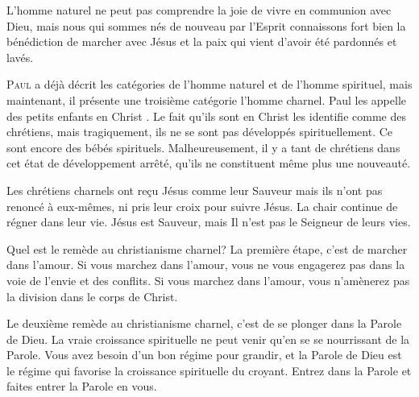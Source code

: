 L'homme naturel ne peut pas comprendre la joie de vivre en communion avec Dieu,
 mais nous qui sommes nés de nouveau par l'Esprit connaissons
 fort bien la bénédiction de marcher avec Jésus
 \ocadr et la paix qui vient d'avoir été pardonnés et lavés.

\dvrule







\lettrine{P}{aul} a déjà décrit les catégories de l'homme naturel
 et de l'homme spirituel, mais maintenant, il présente
 une troisième catégorie \ocadr l'homme charnel.
 Paul les appelle des \Og petits enfants en Christ \Fg{}.
 Le fait qu'ils sont \Og en Christ \Fg{} les identifie
 comme des chrétiens, mais tragiquement, ils ne se sont pas développés
 spirituellement. Ce sont encore des bébés spirituels.
 Malheureusement, il y a tant de chrétiens dans cet état
 de développement arrêté, qu'ils ne constituent même plus une nouveauté.

Les chrétiens charnels ont re\c{c}u Jésus comme leur Sauveur
 mais ils n'ont pas renoncé à eux-mêmes, ni pris leur croix pour suivre Jésus.
 La chair continue de régner dans leur vie.
 Jésus est Sauveur, mais Il n'est pas le Seigneur de leurs vies.


Quel est le remède au christianisme charnel?
 La première étape, c'est de marcher dans l'amour.
 Si vous marchez dans l'amour, vous ne vous engagerez pas
 dans la voie de l'envie et des conflits.
 Si vous marchez dans l'amour, vous n'amènerez pas
 la division dans le corps de Christ.

Le deuxième remède au christianisme charnel,
 c'est de se plonger dans la Parole de Dieu.
 La vraie croissance spirituelle ne peut venir qu'en se se nourrissant
 de la Parole. Vous avez besoin d'un bon régime pour grandir,
 et la Parole de Dieu est le régime qui favorise la croissance
 spirituelle du croyant.
 Entrez dans la Parole et faites entrer la Parole en vous.

